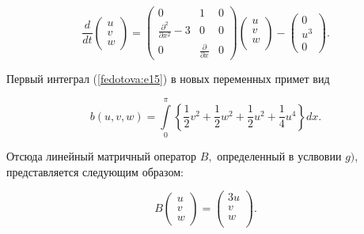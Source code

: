 \begin{equation}

\label{fedotova:e16}

\displaystyle\frac{d}{dt}\left(\begin{array}{llll}u\\v\\w\end{array}\right)=

\left(\begin{array}{ccc} 0& 1& 0\\

\frac{\partial^2}{\partial x^2}-3 & 0& 0\\

0&\frac{\partial}{\partial x}& 0

\end{array}\right)\left(\begin{array}{lll}u\\v\\w\\\end{array}\right)-

\left(\begin{array}{lll}0\\u^3\\0\end{array}\right).

\end{equation}

Первый интеграл (\ref{fedotova:e15}) в новых переменных примет вид

$$

b(u, v, w)=\displaystyle\int\limits_0^\pi\left\{\displaystyle\frac12v^2+

\frac12w^2+\frac12u^2+\frac14u^4\right\}dx.

$$

Отсюда линейный матричный оператор $B,$ определенный в услвовии $g)$, представляется следующим образом:

\begin{equation}

\label{fedotova:e17}

B\left(\begin{array}{llll}u\\v\\w\end{array}\right)=

\left(\begin{array}{lll}3u\\v\\w\\\end{array}\right).

\end{equation}

